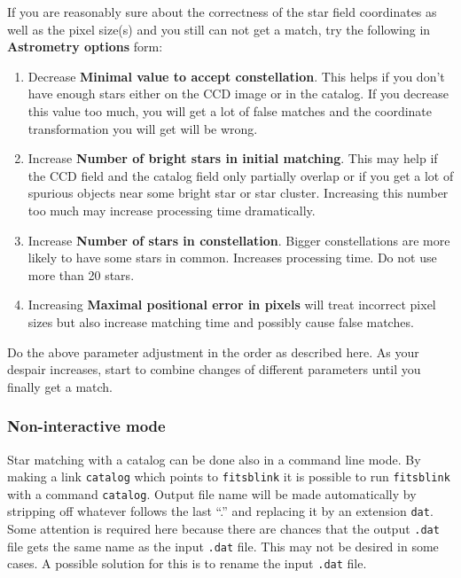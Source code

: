 \documentclass[11pt]{article}
\begin{document}
If you are reasonably sure about the correctness of the star field
coordinates as well as the pixel size(s) and you still can not get a
match, try the following in \textbf{Astrometry options} form:

\begin{enumerate}
\item Decrease \textbf{Minimal value to accept constellation}.  This
helps if you don't have enough stars either on the CCD image or in the
catalog.  If you decrease this value too much, you will get a lot of
false matches and the coordinate transformation you will get will be
wrong. 
\item Increase \textbf{Number of bright stars in initial matching}.
This may help if the CCD field and the catalog field only partially
overlap or if you get a lot of spurious objects near some bright star
or star cluster.  Increasing this number too much may increase
processing time dramatically.
\item Increase \textbf{Number of stars in constellation}.  Bigger
constellations are more likely to have some stars in common.
Increases processing time.  Do not use more than 20 stars.
\item Increasing \textbf{Maximal positional error in pixels} will
treat incorrect pixel sizes but also increase matching time and
possibly cause false matches.
\end{enumerate}

Do the above parameter adjustment in the order as described here.  As
your despair increases, start to combine changes of different
parameters until you finally get a match.

\subsubsection{Non-interactive mode}
\label{catalog}
Star matching with a catalog can be done also in a command line mode.
By making a link \verb=catalog= which points to \verb=fitsblink= it is
possible to run \verb=fitsblink= with a command \verb=catalog=.
Output file name will be made automatically by stripping off whatever
follows the last ``.'' and replacing it by an extension \verb=dat=.
Some attention is required here because there are chances that the
output \verb=.dat= file gets the same name as the input \verb=.dat=
file.  This may not be desired in some cases.  A possible solution for
this is to rename the input \verb=.dat= file.
\end{document}
